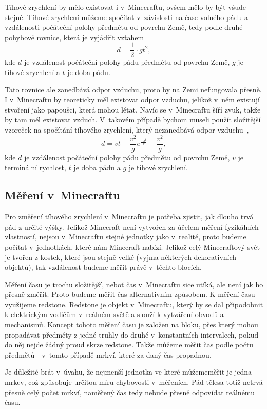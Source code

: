 \documentclass[a4paper, twoside]{article}
\begin{document}
Tíhové zrychlení by mělo existovat i v~Minecraftu, ovšem mělo by být všude stejné. Tíhové zrychlení můžeme spočítat v~závislosti na čase volného pádu a vzdálenosti počáteční polohy předmětu od povrchu Země, tedy podle druhé pohybové rovnice, která je vyjádřit vztahem
$$d=\frac{1}{2}\cdot gt^2,$$
kde $d$ je vzdálenost počáteční polohy pádu předmětu od povrchu Země, $g$ je tíhové zrychlení a $t$ je doba pádu.

Tato rovnice ale zanedbává odpor vzduchu, proto by na Zemi nefungovala přesně. I v~Minecraftu by teoreticky měl existovat odpor vzduchu, jelikož v~něm existují stvoření jako papoušci, která mohou létat. Navíc se v~Minecraftu šíří zvuk, takže by tam měl existovat vzduch. V~takovém případě bychom museli použít složitější vzoreček na spočítání tíhového zrychlení, který nezanedbává odpor vzduchu~\cite{gravity-equation},
$$d=vt + \frac{v^2}{g}e^\frac{-gt}{v}-\frac{v^2}{g},$$
kde $d$ je vzdálenost počáteční polohy pádu předmětu od povrchu Země, $v$ je terminální rychlost, $t$ je doba pádu a $g$ je tíhové zrychlení.

\subsection{Měření v~Minecraftu}
Pro změření tíhového zrychlení v~Minecraftu je potřeba zjistit, jak dlouho trvá pád z určité výšky. Jelikož Minecraft není vytvořen za účelem měření fyzikálních vlastností, nejsou v~Minecraftu stejné jednotky jako v~realitě, proto budeme počítat v~jednotkách, které nám Minecraft nabízí. Jelikož celý Minecraftový svět je tvořen z kostek, které jsou stejně velké (vyjma některých dekorativních objektů), tak vzdálenost budeme měřit právě v~těchto blocích. 

Měření času je trochu složitější, neboť čas v~Minecraftu sice utíká, ale není jak ho přesně změřit. Proto budeme měřit čas alternativním způsobem. K měření času využijeme redstone. Redstone je objekt v~Minecraftu, který by se dal připodobnit k elektrickým vodičům v~reálném světě a slouží k vytváření obvodů a mechanismů. Koncept tohoto měření času je založen na bloku, přes který mohou propadávat předměty z jedné truhly do druhé v~konstantních intervalech, pokud do něj nejde žádný proud skrze redstone. Takže můžeme měřit čas podle počtu předmětů - v~tomto případě mrkví, které za daný čas propadnou.

Je důležité brát v~úvahu, že nejmenší jednotka ve které můžememěřit je jedna mrkev, což způsobuje určitou míru chybovosti v~měřeních. Pád tělesa totiž netrvá přesně celý počet mrkví, naměřený čas tedy nebude přesně odpovídat reálnému času.
\end{document}
